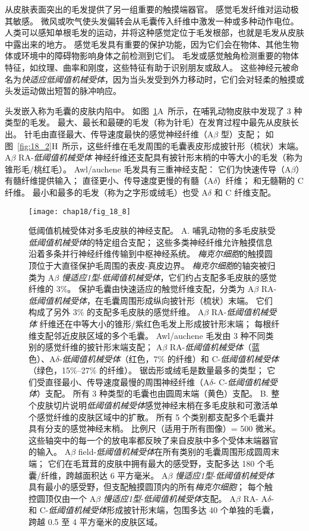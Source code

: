 从皮肤表面突出的毛发提供了另一组重要的触摸端器官。 
感觉毛发纤维对运动极其敏感。
微风或吹气使头发偏转会从毛囊传入纤维中激发一种或多种动作电位。
人类可以感知单根毛发的运动，并将这种感觉定位于毛发根部，也就是毛发从皮肤中露出来的地方。
感觉毛发具有重要的保护功能，因为它们会在物体、其他生物体或环境中的障碍物影响身体之前检测到它们。
毛发或感觉触角检测重要的物体特征，如纹理、曲率和刚度，这些特征有助于识别朋友或敌人。
这些神经元被命名为\textit{快适应低阈值机械受体}，因为当头发受到外力移动时，它们会对轻柔的触摸或头发运动做出短暂的脉冲响应。


头发嵌入称为毛囊的皮肤内陷中。
如图~\ref{fig:18_8}A~所示，在哺乳动物皮肤中发现了 3 种类型的毛发。
最大、最长和最硬的毛发（称为针毛）在发育过程中最先从皮肤长出。
针毛由直径最大、传导速度最快的感觉神经纤维（A$\beta$ 型）支配；
如图~\ref{fig:18_2}H~所示，这些纤维在毛发周围的毛囊表皮形成披针形（梳状）末端。
A$\beta$ RA-\textit{低阈值机械受体} 神经纤维还支配具有披针形末梢的中等大小的毛发（称为锥形毛/桃红毛）。
Awl/auchene 毛发具有三重神经支配：
它们为快速传导（A$\beta$）有髓纤维提供输入；
直径更小、传导速度更慢的有髓（A$\delta$）纤维；
和无髓鞘的 C 纤维。
最小和最多的毛发（称为之字形或绒毛）也受 A$\delta$ 和 C 纤维支配。


\begin{figure}[htbp]
	\centering
	\texttt{[image: chap18/fig\_18\_8]}
	\caption{低阈值机械受体对多毛皮肤的神经支配。
		A. 哺乳动物的多毛皮肤受\textit{低阈值机械受体}的特定组合支配；
		这些多类神经纤维允许触摸信息沿着多条并行神经纤维传输到中枢神经系统。
		\textit{梅克尔细胞}的触摸圆顶位于大直径保护毛周围的表皮-真皮边界。
		\textit{梅克尔细胞}的轴突被归类为 A$\beta$ \textit{慢适应1型}-\textit{低阈值机械受体}，它们约占支配多毛皮肤的感觉纤维的 3\%。
		保护毛囊由快速适应的触觉纤维支配，分类为 A$\beta$ RA-\textit{低阈值机械受体}，在毛囊周围形成纵向披针形（梳状）末端。
		它们构成了另外 3\% 的支配多毛皮肤的感觉纤维。
		A$\beta$ RA-\textit{低阈值机械受体} 纤维还在中等大小的锥形/紫红色毛发上形成披针形末端； 每根纤维支配邻近皮肤区域的多个毛囊。
		Awl/auchene 毛发由 3 种不同类别的感觉纤维的披针形末端支配； A$\beta$ RA-\textit{低阈值机械受体}（蓝色）、A$\delta$-\textit{低阈值机械受体}（红色，7\% 的纤维）和 C-\textit{低阈值机械受体}（绿色，15\%–27\% 的纤维）。
		锯齿形或绒毛是数量最多的类型；
		它们受直径最小、传导速度最慢的周围神经纤维（A$\delta$- C-\textit{低阈值机械受体}）支配。 
		所有 3 种类型的毛囊也由圆周末端（黄色）支配\cite{zimmerman2014gentle}。
		B. 整个皮肤切片说明\textit{低阈值机械受体}感觉神经末梢在多毛皮肤和可激活单个感觉纤维的皮肤区域中的扩散。
		所有 5 个类别都支配多个毛囊并具有分支的感觉神经末梢。
		比例尺（适用于所有图像）= 500 微米。 
		这些轴突中的每一个的放电率都反映了来自皮肤中多个受体末端器官的输入。
		A$\beta$ field-\textit{低阈值机械受体}在所有类别的毛囊周围形成圆周末端；
		它们在毛茸茸的皮肤中拥有最大的感受野，支配多达 180 个毛囊/纤维，跨越面积达 6 平方毫米。
		A$\beta$ \textit{慢适应1型}-\textit{低阈值机械受体}具有最小的感受野，但支配触摸圆顶内的所有\textit{梅克尔细胞}；
		每个触控圆顶仅由一个 A$\beta$ \textit{慢适应1型}-\textit{低阈值机械受体}支配。
		A$\beta$ RA- A$\delta$- 和 C-\textit{低阈值机械受体}形成披针形末端，包围多达 40 个单独的毛囊，跨越 0.5 至 4 平方毫米的皮肤区域\cite{bai2015genetic}。}
	\label{fig:18_8}
\end{figure}


